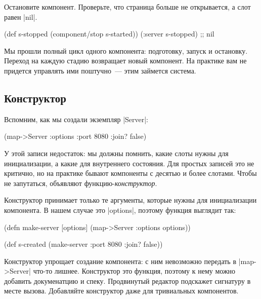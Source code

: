 Остановите компонент. Проверьте, что страница больше не открывается, а слот
равен \spverb|nil|.

\begin{english}
  \begin{clojure}
(def s-stopped (component/stop s-started))
(:server s-stopped) ;; nil
  \end{clojure}
\end{english}

Мы прошли полный цикл одного компонента: подготовку, запуск и остановку. Переход
на каждую стадию возвращает новый компонент. На практике вам не придется
управлять ими поштучно~--- этим займется система.

\subsection{Конструктор}

Вспомним, как мы создали экземпляр \spverb|Server|:

\begin{english}
  \begin{clojure}
(map->Server {:options {:port 8080 :join? false}})
  \end{clojure}
\end{english}

У этой записи недостаток: мы должны помнить, какие слоты нужны для
инициализации, а какие для внутреннего состояния. Для простых записей это не
критично, но на практике бывают компоненты с десятью и более слотами. Чтобы не
запутаться, объявляют функцию-\emph{конструктор}.

Конструктор принимает только те аргументы, которые нужны для инициализации
компонента. В нашем случае это \spverb|options|, поэтому функция выглядит так:

\begin{english}
  \begin{clojure}
(defn make-server
  [options]
  (map->Server {:options options}))

(def s-created (make-server {:port 8080 :join? false}))
  \end{clojure}
\end{english}

Конструктор упрощает создание компонента: с ним невозможно передать в
\spverb|map->Server| что-то лишнее. Конструктор это функция, поэтому к нему
можно добавить докуменатцию и спеку. Продвинутый редактор подскажет сигнатуру в
месте вызова. Добавляйте конструктор даже для тривиальных компонентов.

